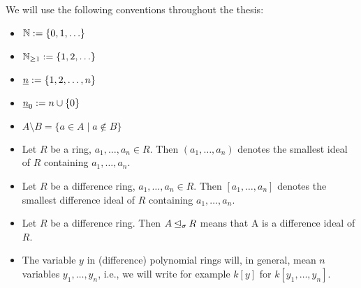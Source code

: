 We will use the following conventions throughout the thesis:
\begin{itemize}
\item $\mathbb{N} := \{0,1,\ldots \}$
\item $\mathbb{N}_{\geq1} := \{1,2,\ldots \}$
\item $ \underline{n} := \{1,2,\ldots, n\}$
\item $ \underline{n}_0 := n \cup \{0\}$
\item $A \setminus B = \{ a \in A \mid a \notin B \}$
\item Let $R$ be a ring, $a_1,\ldots,a_n \in R$. Then $(a_1,\ldots,a_n)$ denotes the smallest ideal of $R$ containing $a_1,\ldots,a_n$.
\item Let $R$ be a difference ring, $a_1,\ldots,a_n \in R$. Then $[a_1,\ldots,a_n]$ denotes the smallest difference ideal of $R$ containing $a_1,\ldots,a_n$.
\item Let $R$ be a difference ring. Then $A \unlhd_{\sigma} R$ means that A is a difference ideal of $R$.
\item The variable $y$ in (difference) polynomial rings will, in general, mean $n$ variables $y_1, \ldots, y_n$, i.e., we will write for example $k[y]$ for $k[y_1,\ldots,y_n]$.
\end{itemize}
\clearpage
